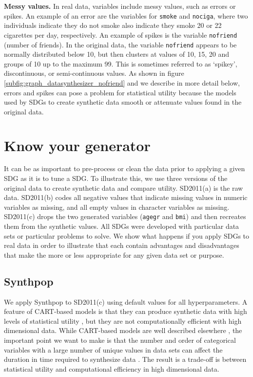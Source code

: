 \documentclass[runningheads]{llncs}
\begin{document}
{\bf Messy values.} In real data, variables include messy values, such as errors or spikes.  An example of an error are the variables for \texttt{smoke} and \texttt{nociga}, where two individuals indicate they do not smoke also indicate they smoke 20 or 22 cigarettes per day, respectively.  An example of spikes is the variable \texttt{nofriend} (number of friends).  In the original data, the variable \texttt{nofriend} appears to be normally distributed below 10, but then clusters at values of 10, 15, 20 and groups of 10 up to the maximum 99.  This is sometimes referred to as `spikey', discontinuous, or semi-continuous values.  As shown in figure \ref{subfig:graph_datasynthesizer_nofriend} and we describe in more detail below, errors and spikes can pose a problem for statistical utility because the models used by SDGs to create synthetic data smooth or attenuate values found in the original data.

\section{Know your generator}\label{sec:know_your_generator}

It can be as important to pre-process or clean the data prior to applying a given SDG as it is to tune a SDG.  To illustrate this, we use three versions of the original data to create synthetic data and compare utility.  SD2011(a) is the raw data.  SD2011(b) codes all negative values that indicate missing values in numeric variables as missing, and all empty values in character variables as missing.  SD2011(c) drops the two generated variables (\texttt{agegr} and \texttt{bmi}) and then recreates them from the synthetic values.  All SDGs were developed with particular data sets or particular problems to solve.  We show what happens if you apply SDGs to real data in order to illustrate that each contain advantages and disadvantages that make the more or less appropriate for any given data set or purpose.  

\subsection{Synthpop} 

We apply Synthpop to SD2011(c) using default values for all hyperparameters.  A feature of CART-based models is that they can produce synthetic data with high levels of statistical utility \cite{little2022comparing,dankar2021fake,drechsler2011empirical}, but they are not computationally efficient with high dimensional data.  While CART-based models are well described elsewhere \cite{breiman2017classification,reiter2005using}, the important point we want to make is that the number and order of categorical variables with a large number of unique values in data sets can affect the duration in time required to synthesize data \cite{raab2017guidelines}.  The result is a trade-off is between statistical utility and computational efficiency in high dimensional data.
\end{document}
